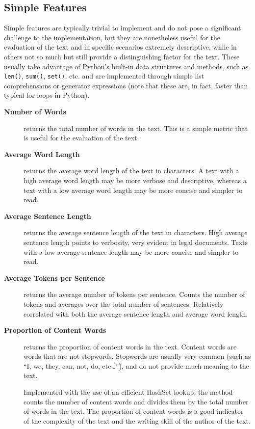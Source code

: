 \subsection{Simple Features}
Simple features are typically trivial to implement and do not pose a significant challenge to the implementation, but they are nonetheless useful for the evaluation of the text and in specific scenarios extremely descriptive, while in others not so much but still provide a distinguishing factor for the text. These usually take advantage of Python's built-in data structures and methods, such as \texttt{len()}, \texttt{sum()}, \texttt{set()}, etc. and are implemented through simple list comprehensions or generator expressions (note that these are, in fact, faster than typical for-loops in Python).
\begin{description}
    \item[\textbf{Number of Words}] returns the total number of words in the text. This is a simple metric that is useful for the evaluation of the text. 

    \item[\textbf{Average Word Length}] returns the average word length of the text in characters. A text with a high average word length may be more verbose and descriptive, whereas a text with a low average word length may be more concise and simpler to read.
    \item[\textbf{Average Sentence Length}] returns the average sentence length of the text in characters. High average sentence length points to verbosity, very evident in legal documents. Texts with a low average sentence length may be more concise and simpler to read.
    \item[\textbf{Average Tokens per Sentence}] returns the average number of tokens per sentence. Counts the number of tokens and averages over the total number of sentences. Relatively correlated with both the average sentence length and average word length.
    \item[\textbf{Proportion of Content Words}] returns the proportion of content words in the text. Content words are words that are not stopwords. Stopwords are usually very common (such as ``I, we, they, can, not, do, etc\dots''), and do not provide much meaning to the text. 
    
    Implemented with the use of an efficient HashSet lookup, the method counts the number of content words and divides them by the total number of words in the text. The proportion of content words is a good indicator of the complexity of the text and the writing skill of the author of the text. 

\end{description}

